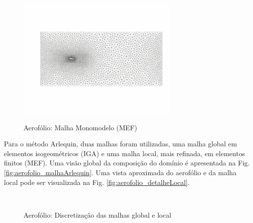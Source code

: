 \documentclass[tese_patricia]{subfiles}
\begin{document}
\begin{figure}[htb!]
	\centering 
	{\includegraphics[scale=2.5,trim=0cm 0.9cm 0cm 0.8cm, clip=true]{Imagens/Cap6/aerofolio_malhaMonoFEM.pdf}}	
	\caption{Aerofólio: Malha Monomodelo (MEF) }
	\label{fig:aerofolio_malhaMonoFEM}
\end{figure}


Para o método Arlequin, duas malhas foram utilizadas, uma malha global em elementos isogeométricos (IGA) e uma malha local, mais refinada, em elementos finitos (MEF). Uma visão global da composição do domínio é apresentada na Fig. \ref{fig:aerofolio_malhaArlequin}. Uma vista aproximada do aerofólio e da malha local pode ser visualizada na Fig. \ref{fig:aerofolio_detalheLocal}.

\begin{figure}[!htb]
	\centering
	\\
	\caption{Aerofólio: Discretização das malhas global e local}
	\label{fig:aerofolio_malhaArlequin_detalheLocal}
\end{figure}
\end{document}
